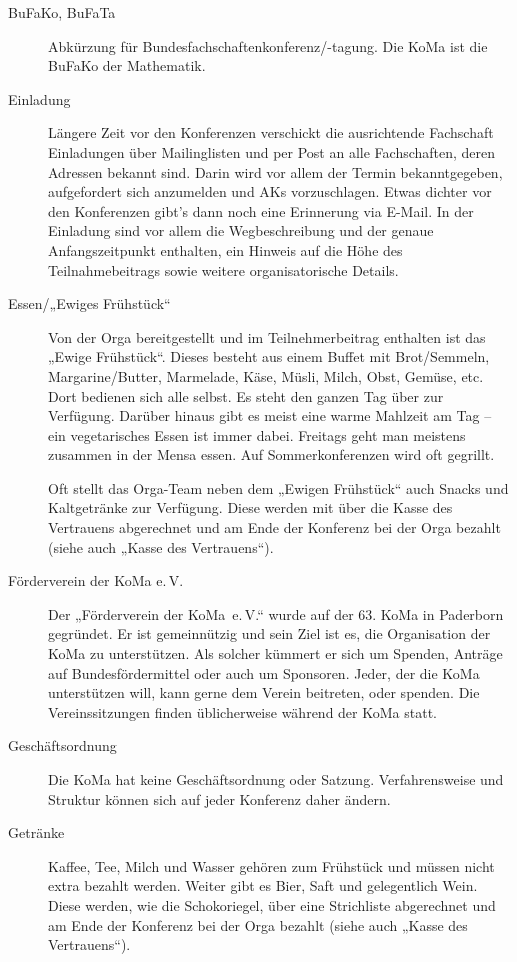 \begin{description}
\item[BuFaKo, BuFaTa] Abkürzung für Bundesfachschaftenkonferenz/-tagung. Die KoMa ist die BuFaKo der Mathematik.

\item[Einladung]
    Längere Zeit vor den Konferenzen verschickt die ausrichtende Fachschaft Einladungen über Mailinglisten und per Post an alle Fachschaften, deren Adressen bekannt sind. Darin wird vor allem der Termin bekanntgegeben, aufgefordert sich anzumelden und AKs vorzuschlagen. Etwas dichter vor den Konferenzen gibt’s dann noch eine Erinnerung via E-Mail. In der Einladung sind vor allem die Wegbeschreibung und der genaue Anfangszeitpunkt enthalten, ein Hinweis auf die Höhe des Teilnahmebeitrags sowie weitere organisatorische Details.

\item[Essen/„Ewiges Frühstück“]
    Von der Orga bereitgestellt und im Teilnehmerbeitrag enthalten ist das „Ewige Frühstück“. Dieses besteht aus einem Buffet mit Brot/Semmeln, Margarine/Butter, Marmelade, Käse, Müsli, Milch, Obst, Gemüse, etc. Dort bedienen sich alle selbst. Es steht den ganzen Tag über zur Verfügung. Darüber hinaus gibt es meist eine warme Mahlzeit am Tag -- ein vegetarisches Essen ist immer dabei. Freitags geht man meistens zusammen in der Mensa essen. Auf Sommerkonferenzen wird oft gegrillt.

	Oft stellt das Orga-Team neben dem „Ewigen Frühstück“ auch Snacks und Kaltgetränke zur Verfügung. Diese werden mit über die Kasse des Vertrauens abgerechnet und am Ende der Konferenz bei der Orga bezahlt (siehe auch „Kasse des Vertrauens“).

\item[Förderverein der KoMa e.\,V.]
    Der „Förderverein der KoMa~e.\,V.“ wurde auf der 63. KoMa in Paderborn gegründet. Er ist gemeinnützig und sein Ziel ist es, die Organisation der KoMa zu unterstützen. Als solcher kümmert er sich um Spenden, Anträge auf Bundesfördermittel oder auch um Sponsoren. Jeder, der die KoMa unterstützen will, kann gerne dem Verein beitreten, oder spenden. Die Vereinssitzungen finden üblicherweise während der KoMa statt.

\item[Geschäftsordnung]
    Die KoMa hat keine Geschäftsordnung oder Satzung. Verfahrensweise und Struktur können sich auf jeder Konferenz daher ändern.

\item[Getränke]
    Kaffee, Tee, Milch und Wasser gehören zum Frühstück und müssen nicht extra bezahlt werden. Weiter gibt es Bier, Saft und gelegentlich Wein. Diese werden, wie die Schokoriegel, über eine Strichliste abgerechnet und am Ende der Konferenz bei der Orga bezahlt (siehe auch „Kasse des Vertrauens“).


\end{description}
